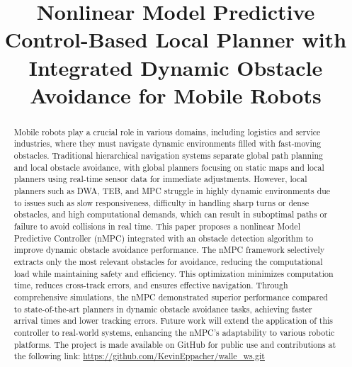 \documentclass[conference]{IEEEtran}
\begin{document}
\title{Nonlinear Model Predictive Control-Based Local Planner with Integrated Dynamic Obstacle Avoidance for Mobile Robots}

\author{
}


\maketitle

\begin{abstract}


Mobile robots play a crucial role in various domains, including logistics and service industries, where they must navigate dynamic environments filled with fast-moving obstacles. Traditional hierarchical navigation systems separate global path planning and local obstacle avoidance, with global planners focusing on static maps and local planners using real-time sensor data for immediate adjustments. However, local planners such as DWA, TEB, and MPC struggle in highly dynamic environments due to issues such as slow responsiveness, difficulty in handling sharp turns or dense obstacles, and high computational demands, which can result in suboptimal paths or failure to avoid collisions in real time. This paper proposes a nonlinear Model Predictive Controller (nMPC) integrated with an obstacle detection algorithm to improve dynamic obstacle avoidance performance. The nMPC framework selectively extracts only the most relevant obstacles for avoidance, reducing the computational load while maintaining safety and efficiency. This optimization minimizes computation time, reduces cross-track errors, and ensures effective navigation. Through comprehensive simulations, the nMPC demonstrated superior performance compared to state-of-the-art planners in dynamic obstacle avoidance tasks, achieving faster arrival times and lower tracking errors. Future work will extend the application of this controller to real-world systems, enhancing the nMPC’s adaptability to various robotic platforms.
The project is made available on GitHub for public use and contributions at the following link: \url{https://github.com/KevinEppacher/walle\_ws.git}
\end{abstract}
\end{document}
